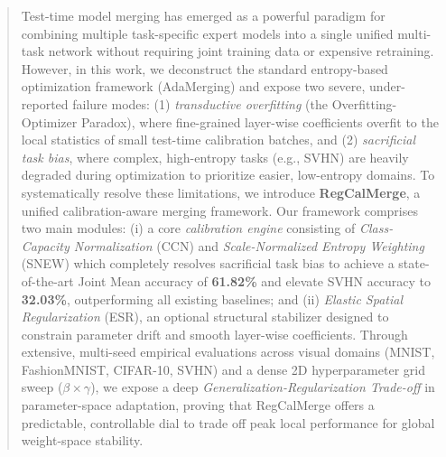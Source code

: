 \begin{abstract}
Test-time model merging has emerged as a powerful paradigm for combining multiple task-specific expert models into a single unified multi-task network without requiring joint training data or expensive retraining. However, in this work, we deconstruct the standard entropy-based optimization framework (AdaMerging) and expose two severe, under-reported failure modes: (1) \emph{transductive overfitting} (the Overfitting-Optimizer Paradox), where fine-grained layer-wise coefficients overfit to the local statistics of small test-time calibration batches, and (2) \emph{sacrificial task bias}, where complex, high-entropy tasks (e.g., SVHN) are heavily degraded during optimization to prioritize easier, low-entropy domains. To systematically resolve these limitations, we introduce \textbf{RegCalMerge}, a unified calibration-aware merging framework. Our framework comprises two main modules: (i) a core \emph{calibration engine} consisting of \emph{Class-Capacity Normalization} (CCN) and \emph{Scale-Normalized Entropy Weighting} (SNEW) which completely resolves sacrificial task bias to achieve a state-of-the-art Joint Mean accuracy of \textbf{61.82\%} and elevate SVHN accuracy to \textbf{32.03\%}, outperforming all existing baselines; and (ii) \emph{Elastic Spatial Regularization} (ESR), an optional structural stabilizer designed to constrain parameter drift and smooth layer-wise coefficients. Through extensive, multi-seed empirical evaluations across visual domains (MNIST, FashionMNIST, CIFAR-10, SVHN) and a dense 2D hyperparameter grid sweep ($\beta \times \gamma$), we expose a deep \emph{Generalization-Regularization Trade-off} in parameter-space adaptation, proving that RegCalMerge offers a predictable, controllable dial to trade off peak local performance for global weight-space stability.
\end{abstract}